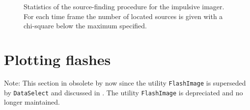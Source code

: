 \begin{figure}[th]
	\caption{Statistics of the source-finding procedure for the impulsive imager. For each time frame the number of located sources is given with a chi-square below the maximum specified.}	 
\end{figure}

\section{Plotting flashes}

Note: This section in obsolete by now since the utility \verb!FlashImage! is superseded by \verb!DataSelect! and discussed in .
The utility \verb!FlashImage! is depreciated and no longer maintained.

